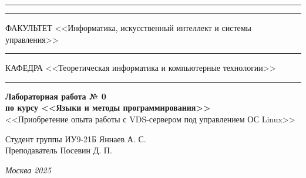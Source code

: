 \documentclass[a4paper, 14pt]{extarticle}
\begin{document}
\begin{titlepage}
\vspace{-25pt}
\hspace{-35pt}\rule{\textwidth}{2.3pt}

\vspace*{-20.3pt}
\hspace{-35pt}\rule{\textwidth}{0.4pt}

\vspace{1.5ex}
\hspace{-35pt} \noindent \small ФАКУЛЬТЕТ\hspace{30pt} <<Информатика, искусственный интеллект и системы управления>>

\vspace*{-16pt}
\hspace{47pt}\rule{0.83\textwidth}{0.4pt}

\vspace{0.5ex}
\hspace{-35pt} \noindent \small КАФЕДРА\hspace{50pt} <<Теоретическая информатика и компьютерные технологии>>

\vspace*{-16pt}
\hspace{30pt}\rule{0.866\textwidth}{0.4pt}
  
\vspace{11em}

\begin{center}
\Large {\bf Лабораторная работа № 0} \\ 
\large {\bf по курсу <<Языки и методы программирования>>} \\
\large <<Приобретение опыта работы с VDS-сервером под управлением ОС Linux>> 
\end{center}\normalsize

\vspace{8em}


\begin{flushright}
  {Студент группы ИУ9-21Б Яннаев А. С. \hspace*{15pt}\\ 
  \vspace{2ex}
  Преподаватель Посевин Д. П.\hspace*{15pt}}
\end{flushright}

\bigskip

\vfill
 

\begin{center}
\textsl{Москва 2025}
\end{center}
\end{titlepage}
\end{document}
